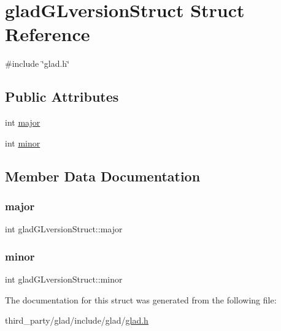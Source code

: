 \hypertarget{structgladGLversionStruct}{}\section{glad\+G\+Lversion\+Struct Struct Reference}
\label{structgladGLversionStruct}


{\ttfamily \#include \char`\"{}glad.\+h\char`\"{}}

\subsection*{Public Attributes}
\begin{DoxyCompactItemize}
\item 
int \mbox{\hyperlink{structgladGLversionStruct_ac7f9db11d2679df12ef0313b728554db}{major}}
\item 
int \mbox{\hyperlink{structgladGLversionStruct_acc2bff1c8966c6866f2ad6f5a4e475b2}{minor}}
\end{DoxyCompactItemize}


\subsection{Member Data Documentation}
\mbox{\label{structgladGLversionStruct_ac7f9db11d2679df12ef0313b728554db}} 
\subsubsection{\texorpdfstring{major}{major}}
{\footnotesize\ttfamily int glad\+G\+Lversion\+Struct\+::major}

\mbox{\label{structgladGLversionStruct_acc2bff1c8966c6866f2ad6f5a4e475b2}} 
\subsubsection{\texorpdfstring{minor}{minor}}
{\footnotesize\ttfamily int glad\+G\+Lversion\+Struct\+::minor}



The documentation for this struct was generated from the following file\+:\begin{DoxyCompactItemize}
\item 
third\+\_\+party/glad/include/glad/\mbox{\hyperlink{glad_8h}{glad.\+h}}\end{DoxyCompactItemize}
